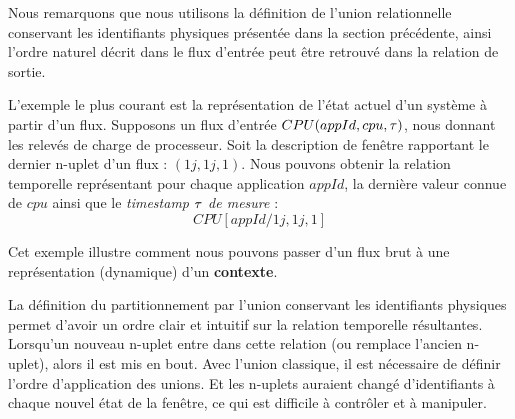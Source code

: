 Nous remarquons que nous utilisons la définition de l'union relationnelle conservant les identifiants physiques présentée dans la section précédente, ainsi l'ordre naturel décrit dans le flux d'entrée peut être retrouvé dans la relation de sortie.
\begin{example}
	L'exemple le plus courant est la représentation de l'état actuel d'un système à partir d'un flux. Supposons un flux d'entrée $CPU(appId,cpu,\tau)$, nous donnant les relevés de charge de processeur. Soit la description de fenêtre rapportant le dernier n-uplet d'un flux : $(1j,1j,1)$. Nous pouvons obtenir la relation temporelle représentant pour chaque application $appId$, la dernière valeur connue de $cpu$ ainsi que le \textit{timestamp $\tau$ de mesure} : $$CPU[appId/1j,1j,1]$$

	Cet exemple illustre comment nous pouvons passer d'un flux brut à une représentation (dynamique) d'un \textbf{contexte}. 
	
	La définition du partitionnement par l'union conservant les identifiants physiques permet d'avoir un ordre clair et intuitif sur la relation temporelle résultantes. Lorsqu'un nouveau n-uplet entre dans cette relation (ou remplace l'ancien n-uplet), alors il est mis en bout. Avec l'union classique, il est nécessaire de définir l'ordre d'application des unions. Et les n-uplets auraient changé d'identifiants à chaque nouvel état de la fenêtre, ce qui est difficile à contrôler et à manipuler.
\end{example}


